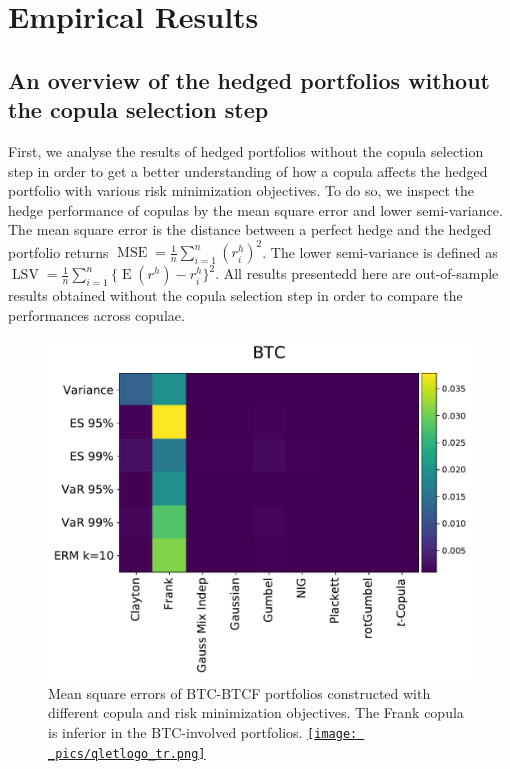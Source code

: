 \section{Empirical Results}\label{sec:results}



\subsection{An overview of the hedged portfolios without the copula selection step}\label{subsec:HP1}
First, we analyse the results of hedged portfolios without the copula
selection step in order to get a better understanding of how a copula
affects the hedged portfolio with various risk minimization
objectives. To do so, we inspect the hedge performance of copulas by
the mean square error and lower semi-variance. The mean square error
is the distance between a perfect hedge and the hedged portfolio
returns $\operatorname{MSE}=\frac{1}{n}\sum_{i=1}^n(r^h_i)^2$. 
The lower semi-variance is defined as 
$\operatorname{LSV}=\frac{1}{n}\sum_{i=1}^n\{\operatorname{E}(r^h)-r^h_i\}^2$. 
All results presentedd here are out-of-sample results obtained without
the copula selection step in order to compare the performances across
copulae.  

\begin{figure}[th]
    \centering
    \includegraphics[width=\textwidth]{_pics/MSE_BTC.pdf}
  \caption{Mean square errors of BTC-BTCF portfolios constructed with different copula and risk minimization objectives.
    The Frank copula is inferior in the BTC-involved portfolios.
    \href{http://www.quantlet.com/}{\texttt{[image: \_pics/qletlogo\_tr.png]}} }
\label{fig:MSE_BTC}
\end{figure}

